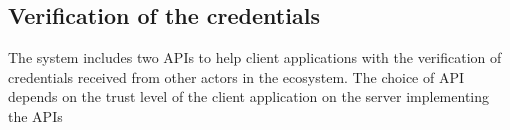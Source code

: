 \documentclass[a4paper,12pt,english]{sphinxhowto}
\begin{document}
\begin{sphinxVerbatim}[commandchars=\\\{\}]
                             
                             
                         
                 \PYG{p}{[}
                \PYG{p}{],}
                 
\end{sphinxVerbatim}


\subsection{Verification of the credentials}
\label{\detokenize{ssi/privacycred:verification-of-the-credentials}}
\sphinxAtStartPar
The system includes two APIs to help client applications with the verification of credentials received from other actors in the ecosystem. The choice of API depends on the trust level of the client application on the server implementing the APIs
\end{document}
